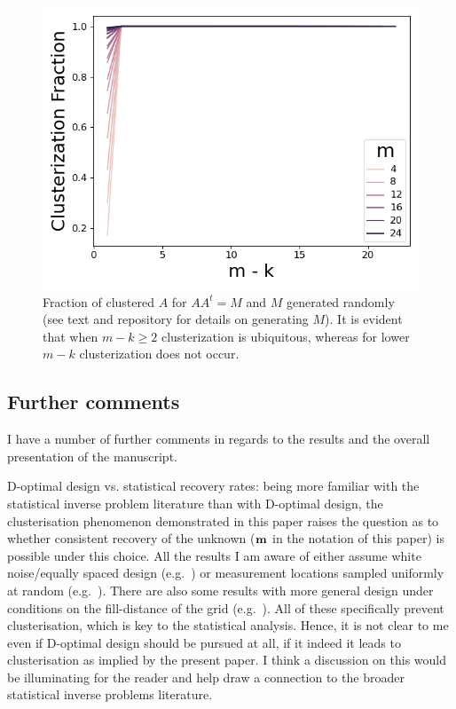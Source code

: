 \begin{figure}
    \centering
    \includegraphics[height=0.5\textwidth]{figs/simulations.png}
    \caption{Fraction of clustered $A$ for $AA^t = M$ and $M$
      generated randomly (see text and repository for details on
      generating $M$). It is evident that when $m-k \geq 2$ clusterization
      is ubiquitous, whereas for lower $m-k$ clusterization does not
      occur.}
  \label{fig:sim_AAt}
\end{figure}

\subsection{Further comments}
\RC I have a number of further comments in regards to the results and the
overall presentation of the manuscript.


\RC D-optimal design vs. statistical recovery rates: being more
familiar with the statistical inverse problem literature than with
D-optimal design, the clusterisation phenomenon demonstrated in this
paper raises the question as to whether consistent recovery of the
unknown ($\mathbf{m}$ in the notation of this paper) is possible under
this choice. All the results I am aware of either assume white
noise/equally spaced design (e.g.~\cite{knapik2011}) or measurement
locations sampled uniformly at random (e.g.~\cite{nickl2023}). There
are also some results with more general design under conditions on the
fill-distance of the grid (e.g.~\cite{teckentrup2020}). All of these
specifically prevent clusterisation, which is key to the statistical
analysis. Hence, it is not clear to me even if D-optimal design should
be pursued at all, if it indeed it leads to clusterisation as implied
by the present paper. I think a discussion on this would be
illuminating for the reader and help draw a connection to the broader
statistical inverse problems literature.

